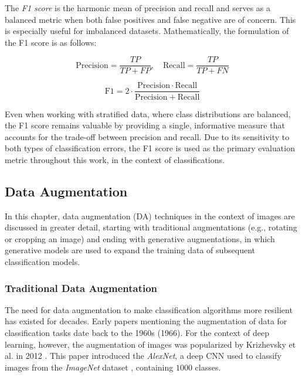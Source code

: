 The \textit{F1 score} is the harmonic mean of precision and recall and serves as a balanced metric when both false positives and false negative are of concern. This is especially useful for imbalanced datasets. Mathematically, the formulation of the F1 score is as follows:

\begin{equation}
    \mathrm{Precision} = \frac{TP}{TP + FP}, \quad \mathrm{Recall} = \frac{TP}{TP + FN}
\end{equation}

\begin{equation}
    \mathrm{F1} = 2 \cdot \frac{\mathrm{Precision} \cdot \mathrm{Recall}}{\mathrm{Precision} + \mathrm{Recall}}
\end{equation}

Even when working with stratified data, where class distributions are balanced, the F1 score remains valuable by providing a single, informative measure that accounts for the trade-off between precision and recall. Due to its sensitivity to both types of classification errors, the F1 score is used as the primary evaluation metric throughout this work, in the context of classifications.



\subsection[Data Augmentation - DA]{Data Augmentation}\label{theoretical_da}
In this chapter, data augmentation (DA) techniques in the context of images are discussed in greater detail, starting with traditional augmentations (e.g., rotating or cropping an image) and ending with generative augmentations, in which generative models are used to expand the training data of subsequent classification models.

\subsubsection[Traditional Data Augmentation - TDA]{Traditional Data Augmentation}\label{theoretical_tda}
The need for data augmentation to make classification algorithms more resilient has existed for decades. Early papers mentioning the augmentation of data for classification tasks date back to the 1960s \cite{Nagy1966} (1966). For the context of deep learning, however, the augmentation of images was popularized by Krizhevsky et al. in 2012 \cite{Krizhevsky2012traditionaldataaugmentation}. This paper introduced the \textit{AlexNet}, a deep CNN used to classify images from the \textit{ImageNet} dataset \cite{ImageNetDataset5206848}, containing $1 000$ classes.

